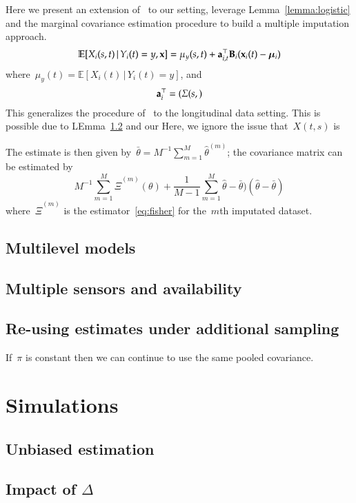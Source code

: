 \documentclass[11pt]{amsart}
\def\E{\mathcal{E}}
\def\E{\mathbb{E}}
\def\given{\, | \,}
\def\bfx{{\bf x}}
\begin{document}
Here we present an extension of~\cite{Reimherr2018} to our setting,
leverage Lemma~\ref{lemma:logistic} and the marginal covariance
estimation procedure to build a multiple imputation approach.
\[
\E [ X_i (s,t) \given Y_i(t) = y, \bfx ] = \mu_y (s,t) + {\bf a}_{i,t}^\top
{\bf B}_i (\bfx_i (t) - \mathbold{\mu}_i )
\]
where~$\mu_y (t) = \E [ X_i (t) \given Y_i (t) = y]$, and
\[
{\bf a}_i^\top = ( \Sigma(s, )
\]
This generalizes the procedure of~\cite{Reimerr2018} to the
longitudinal data setting.
This is possible due to LEmma~\ref{} and our 
Here, we ignore the issue that~$X(t,s)$ is 

The estimate is then given by~$\bar \theta = M^{-1} \sum_{m=1}^M \hat
\theta^{(m)}$; the covariance matrix can be estimated by
\[
M^{-1} \sum_{m=1}^M \hat \Xi^{(m)} (\theta) + \frac{1}{M-1}
\sum_{m=1}^M \hat \theta - \bar \theta) (\hat \theta - \bar \theta)
\]
where~$\hat \Xi^{(m)}$ is the estimator~\eqref{eq:fisher} for
the~$m$th imputated dataset.


\subsection{Multilevel models}

\subsection{Multiple sensors and availability}



\subsection{Re-using estimates under additional sampling}

If~$\pi$ is constant then we can continue to use the same pooled
covariance. 


\section{Simulations}

\subsection{Unbiased estimation}

\subsection{Impact of $\Delta$}
\end{document}
